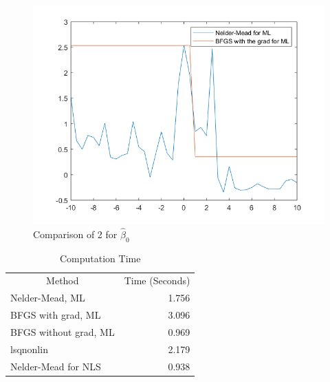 \documentclass[11pt]{article}
\begin{document}
\begin{figure}
\includegraphics{2_2.png}
\caption{Comparison of 2 for $\hat{\beta}_{0}$}
\end{figure}



\begin{table}[]
\begin{center}
\caption{Computation Time}
\begin{tabular}{lr}
\multicolumn{1}{c}{Method} & \multicolumn{1}{c}{Time (Seconds)} \\
Nelder-Mead, ML            & 1.756                              \\
BFGS with grad, ML         & 3.096                              \\
BFGS without grad, ML      & 0.969                              \\
lsqnonlin                  & 2.179                              \\
Nelder-Mead for NLS        & 0.938                             
\end{tabular}
\end{center}
\end{table}
\end{document}
